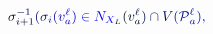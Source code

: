 \documentclass[12pt]{article}
\begin{document}
\makeatletter
\renewcommand*{\@textcolor}[3]{%
  \protect\leavevmode
  \begingroup
    \color#1{#2}#3%
  \endgroup
}
\makeatother
\begin{displaymath}
\mathcolor[RGB]{0,0,15}{\sigma} _ { \mathcolor[RGB]{0,0,30}{i} \mathcolor[RGB]{0,0,45}{+} \mathcolor[RGB]{0,0,60}{1} } ^ { \mathcolor[RGB]{0,0,75}{-} \mathcolor[RGB]{0,0,90}{1} } \mathcolor[RGB]{0,0,105}{(} \mathcolor[RGB]{0,0,120}{\sigma} _ { \mathcolor[RGB]{0,0,135}{i} } \mathcolor[RGB]{0,0,150}{(} \mathcolor[RGB]{0,0,165}{v} _ { \mathcolor[RGB]{0,0,180}{a} } ^ { \mathcolor[RGB]{0,0,195}{\ell} } \mathcolor[RGB]{0,0,210}{)} \mathcolor[RGB]{0,0,225}{\in} \mathcolor[RGB]{0,0,240}{N} _ { \mathcolor[RGB]{0,0,255}{X} _ { \mathcolor[RGB]{0,15,0}{L} } } \mathcolor[RGB]{0,15,15}{(} \mathcolor[RGB]{0,15,30}{v} _ { \mathcolor[RGB]{0,15,45}{a} } ^ { \mathcolor[RGB]{0,15,60}{\ell} } \mathcolor[RGB]{0,15,75}{)} \mathcolor[RGB]{0,15,90}{\cap} \mathcolor[RGB]{0,15,105}{V} \mathcolor[RGB]{0,15,120}{(} \mathcal { \mathcolor[RGB]{0,15,135}{P} } _ { \mathcolor[RGB]{0,15,150}{a} } ^ { \mathcolor[RGB]{0,15,165}{\ell} } \mathcolor[RGB]{0,15,180}{)} \mathcolor[RGB]{0,15,195}{,}
\end{displaymath}
\end{document}
